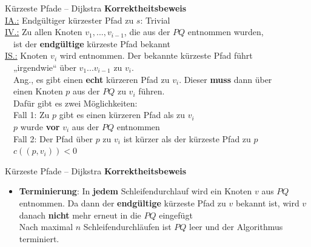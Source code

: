 \begin{frame}{Kürzeste Pfade – Dijkstra}
	\textbf{Korrektheitsbeweis} \\
	\underline{IA.:} Endgültiger kürzester Pfad zu $s$: Trivial \yop \\[0,125cm]
	\pause
	\underline{IV.:} Zu allen Knoten $v_1, ..., v_{i-1}$, die aus der $PQ$ entnommen wurden, \\
	\quad\ \ ist der \textbf{endgültige} kürzeste Pfad bekannt \\[0,125cm]
	\pause
	\underline{IS.:} Knoten $v_i$ wird entnommen. Der bekannte kürzeste Pfad führt \\
	\quad\ \ „irgendwie“ über $v_1 ... v_{i-1}$ zu $v_i$. \\
	\pause
	\quad\ \ Ang., es gibt einen \textbf{echt} kürzeren Pfad zu $v_i$. Dieser \textbf{muss} dann über \\
	\quad\ \ einen Knoten $p$ aus der $PQ$ zu $v_i$ führen. \\
	\pause
	\quad\ \ Dafür gibt es zwei Möglichkeiten: \\
	\pause
	\quad\ \ Fall 1: Zu $p$ gibt es einen kürzeren Pfad als zu $v_i$ \\
	\pause
	\qquad\qquad\ \ \impl $p$ wurde \textbf{vor} $v_i$ aus der $PQ$ entnommen \crash \\
	\pause
	\quad\ \ Fall 2: Der Pfad über $p$ zu $v_i$ ist kürzer als der kürzeste Pfad zu $p$ \\
	\pause
	\qquad\qquad\ \ \impl $c((p, v_i)) < 0$ 
\end{frame}

\begin{frame}{Kürzeste Pfade – Dijkstra}
	\textbf{Korrektheitsbeweis} \\
	\begin{itemize}
		\item \textbf{Terminierung}: In \textbf{jedem} Schleifendurchlauf wird ein Knoten $v$ aus $PQ$ entnommen. Da dann der \textbf{endgültige} kürzeste Pfad zu $v$ bekannt ist, wird $v$ danach \textbf{nicht} mehr erneut in die $PQ$ eingefügt \\
		\impl Nach maximal $n$ Schleifendurchläufen ist $PQ$ leer und der Algorithmus terminiert.
	\end{itemize}
\end{frame}

\fi

